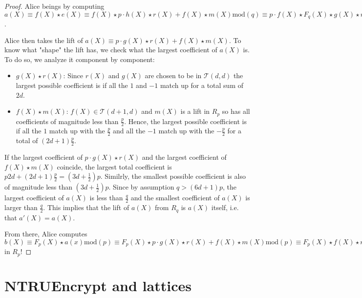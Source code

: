 \documentclass[12pt]{article}
\theoremstyle{definition}
\theoremstyle{proposition}
\theoremstyle{remark}
\theoremstyle{theorem}
\theoremstyle{example}
\newcommand{\cT}{\mathcal{T}}
\begin{document}
\begin{proof}
    Alice beings by computing $a(X) \equiv f(X) \star e(X) \equiv f(X) \star p \cdot h(X) \star r(X) + f(X) \star m(X) \mathrm{mod}(q) \equiv  p \cdot f(X) \star F_q(X) \star g(X) \star r(X) + f(X) \star m(X) \mathrm{mod}(q) \equiv p \cdot g(X) \star r(X) + f(X) \star m(X) \mathrm{mod}(q)$. 

    Alice then takes the lift of $a(X) \equiv p \cdot g(X) \star r(X) + f(X) \star m(X)$. To know what "shape" the lift has, we check what the largest coefficient of $a(X)$ is. To do so, we analyze it component by component:
    
    \begin{itemize}
        \item \underline{$g(X) \star r(X)$}: Since $r(X)$ and $g(X)$ are chosen to be in $\cT(d,d)$ the largest possible coefficient is if all the $1$ and $-1$ match up for a total sum of $2d$.
        \item \underline{$f(X) \star m(X)$}: $f(X) \in \cT(d+1,d)$ and $m(X)$ is a lift in $R_p$ so has all coefficients of magnitude less than $\frac{p}{2}$. Hence, the largest possible coefficient is if all the $1$ match up with the $\frac{p}{2}$ and all the $-1$ match up with the $-\frac{p}{2}$ for a total of $(2d + 1)\frac{p}{2}$.
    \end{itemize}  
    
    If the largest coefficient of $p\cdot g(X) \star r(X)$ and the largest coefficient of $f(X) \star m(X)$ coincide, the largest total coefficient is $p2d + (2d + 1)\frac{p}{2} = (3d + \frac{1}{2})p$. Similrly, the smallest possible coefficient is also of magnitude less than $(3d + \frac{1}{2})p$. Since by assumption $q > (6d + 1)p$, the largest coefficient of $a(X)$ is less than $\frac{q}{2}$ and the smallest coefficient of $a(X)$ is larger than $\frac{q}{2}$. This implies that the lift of $a(X)$ from $R_q$ is $a(X)$ itself, i.e. that $a'(X) = a(X)$.

    From there, Alice computes $b(X) \equiv F_p(X) \star a(x) \mathrm{mod}(p) \equiv F_p(X) \star p \cdot g(X) \star r(X) + f(X) \star m(X) \mathrm{mod}(p) \equiv F_p(X) \star f(X) \star m(X) \mathrm{mod}(p) \equiv m(X) \mathrm{mod}(p)$ in $R_p$!
\end{proof}

\section{NTRUEncrypt and lattices}
\end{document}
